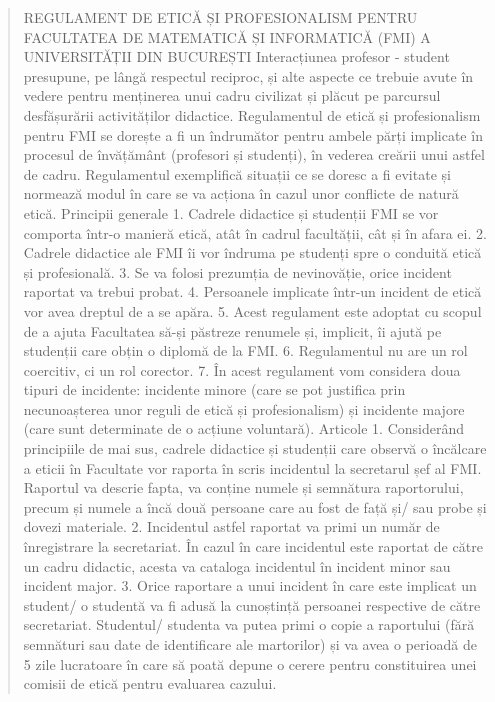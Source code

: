 \documentclass{article}
\begin{document}
\begin{quote}

REGULAMENT DE ETICĂ ȘI PROFESIONALISM
PENTRU FACULTATEA DE MATEMATICĂ ȘI INFORMATICĂ (FMI)
A UNIVERSITĂȚII DIN BUCUREȘTI
Interacțiunea profesor - student presupune, pe lângă respectul reciproc, și alte aspecte
ce trebuie avute în vedere pentru menținerea unui cadru civilizat și plăcut pe parcursul
desfășurării activităților didactice.
Regulamentul de etică și profesionalism pentru FMI se dorește a fi un îndrumător pentru
ambele părți implicate în procesul de învățământ (profesori și studenți), în vederea
creării unui astfel de cadru. Regulamentul exemplifică situații ce se doresc a fi evitate și
normează modul în care se va acționa în cazul unor conflicte de natură etică.
Principii generale
1. Cadrele didactice și studenții FMI se vor comporta într-o manieră etică, atât în cadrul
facultății, cât și în afara ei.
2. Cadrele didactice ale FMI îi vor îndruma pe studenți spre o conduită etică și
profesională.
3. Se va folosi prezumția de nevinovăție, orice incident raportat va trebui probat.
4. Persoanele implicate într-un incident de etică vor avea dreptul de a se apăra.
5. Acest regulament este adoptat cu scopul de a ajuta Facultatea să-și păstreze
renumele și, implicit, îi ajută pe studenții care obțin o diplomă de la FMI.
6. Regulamentul nu are un rol coercitiv, ci un rol corector.
7. În acest regulament vom considera doua tipuri de incidente: incidente minore (care
se pot justifica prin necunoașterea unor reguli de etică și profesionalism) și incidente
majore (care sunt determinate de o acțiune voluntară).
Articole
1. Considerând principiile de mai sus, cadrele didactice și studenții care observă o
încălcare a eticii în Facultate vor raporta în scris incidentul la secretarul șef al FMI.
Raportul va descrie fapta, va conține numele și semnătura raportorului, precum și
numele a încă două persoane care au fost de față și/ sau probe și dovezi materiale.
2. Incidentul astfel raportat va primi un număr de înregistrare la secretariat. În cazul în
care incidentul este raportat de către un cadru didactic, acesta va cataloga incidentul
în incident minor sau incident major.
3. Orice raportare a unui incident în care este implicat un student/ o studentă va fi
adusă la cunoștință persoanei respective de către secretariat. Studentul/ studenta va
putea primi o copie a raportului (fără semnături sau date de identificare ale martorilor)
și va avea o perioadă de 5 zile lucratoare în care să poată depune o cerere pentru
constituirea unei comisii de etică pentru evaluarea cazului.

\end{quote}
\end{document}
